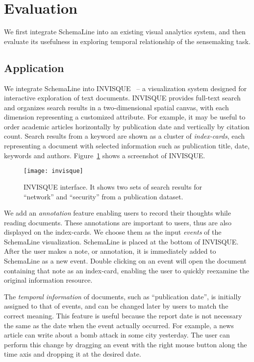 \section{Evaluation}
We first integrate SchemaLine into an existing visual analytics system, and then evaluate its usefulness in exploring temporal relationship of the sensemaking task.

\subsection{Application}
We integrate SchemaLine into INVISQUE~\cite{Wong2011} -- a visualization system designed for interactive exploration of text documents. INVISQUE provides full-text search and organizes search results in a two-dimensional spatial canvas, with each dimension representing a customized attribute. For example, it may be useful to order academic articles horizontally by publication date and vertically by citation count. Search results from a keyword are shown as a cluster of \emph{index-cards}, each representing a document with selected information such as publication title, date, keywords and authors. Figure~\ref{fig:invisque} shows a screenshot of INVISQUE.

\begin{figure}[!htb]
	\centering
	\texttt{[image: invisque]}
	\caption{INVISQUE interface. It shows two sets of search results for ``network'' and ``security'' from a publication dataset.}
	\label{fig:invisque}
\end{figure}

We add an \emph{annotation} feature enabling users to record their thoughts while reading documents. These annotations are important to users, thus are also displayed on the index-cards. We choose them as the input \emph{events} of the SchemaLine visualization. SchemaLine is placed at the bottom of INVISQUE. After the user makes a note, or annotation, it is immediately added to SchemaLine as a new event. Double clicking on an event will open the document containing that note as an index-card, enabling the user to quickly reexamine the original information resource.

The \emph{temporal information} of documents, such as ``publication date'', is initially assigned to that of events, and can be changed later by users to match the correct meaning. This feature is useful because the report date is not necessary the same as the date when the event actually occurred. For example, a news article can write about a bomb attack in some city yesterday. The user can perform this change by dragging an event with the right mouse button along the time axis and dropping it at the desired date. 

